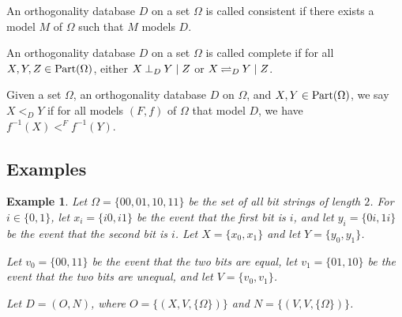 \documentclass[authordate,onecolumn]{miri-tech-article}
\newtheorem{example}{Example}
\begin{document}
\begin{definition}
An orthogonality database $D$ on a set $\Omega$ is called consistent if there exists a model $M$ of $\Omega$ such that $M$ models $D$. 
\end{definition}

\begin{definition}
An orthogonality database $D$ on a set $\Omega$ is called complete if for all $X,Y,Z\in\parts[\Omega]$, either $\cod{X}{Y}{Z}$ or $\ncod{X}{Y}{Z}$.
\end{definition}

\begin{definition}
Given a set $\Omega$, an orthogonality database $D$ on $\Omega$, and $X,Y\in\parts[\Omega]$, we say $X<_DY$ if for all models $(F,f)$ of $\Omega$ that model $D$, we have $f^{-1}(X)<^Ff^{-1}(Y)$. 
\end{definition}

\subsection{Examples}
\begin{example}\label{ex1}
Let $\Omega=\{00,01,10,11\}$ be the set of all bit strings of length $2$. For $i\in\{0,1\}$, let $x_i=\{i0,i1\}$ be the event that the first bit is $i$, and let $y_i=\{0i,1i\}$ be the event that the second bit is $i$. Let $X=\{x_0,x_1\}$ and let $Y=\{y_0,y_1\}$. 

Let $v_0=\{00,11\}$ be the event that the two bits are equal, let $v_1=\{01,10\}$ be the event that the two bits are unequal, and let $V=\{v_0,v_1\}$. 

Let $D=(O,N)$, where $O=\{(X,V,\{\Omega\})\}$ and $N=\{(V,V,\{\Omega\})\}$.
\end{example}
\end{document}
